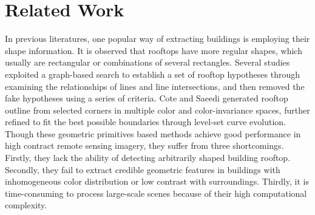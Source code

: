 \documentclass[runningheads]{llncs}
\begin{document}
\section{Related Work}
\label{section:relatedworks}
   In previous literatures, one popular way of extracting buildings is employing their shape information. It is observed that rooftops have more regular shapes, which usually are rectangular or combinations of several rectangles. Several studies   \cite{noronha2001detection,nosrati2009novel,izadi2012three,wang2015efficient} exploited a graph-based search to establish a set of rooftop hypotheses through examining the relationships of lines and line intersections, and then removed the fake hypotheses using a series of criteria. Cote and Saeedi \cite{cote2013automatic} generated rooftop outline from selected corners in  multiple color and color-invariance spaces, further refined to fit the best possible boundaries through level-set curve evolution. Though these geometric primitives based methods achieve good performance in high contract remote sensing imagery, they suffer from three  shortcomings. Firstly, they lack the ability of detecting arbitrarily shaped building rooftop. Secondly, they fail to  extract credible geometric features in buildings with inhomogeneous color distribution or low contrast with surroundings. Thirdly, it is time-consuming to process large-scale scenes because of their high computational complexity.	
   
\end{document}
